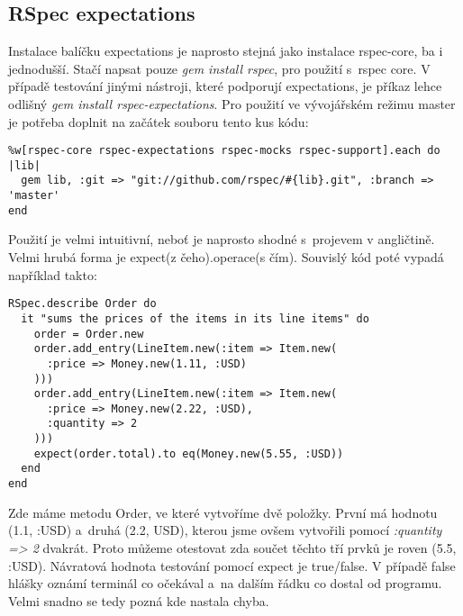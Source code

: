 \subsection{RSpec expectations}
\par Instalace balíčku expectations je naprosto stejná jako instalace rspec-core, ba i jednodušší. Stačí napsat pouze \textit{gem install rspec}, pro použití s~rspec core. V případě testování jinými nástroji, které podporují expectations, je příkaz lehce odlišný \textit{gem install rspec-expectations}. Pro použití ve vývojářském režimu master je potřeba doplnit na začátek souboru tento kus kódu:
\begin{verbatim}
%w[rspec-core rspec-expectations rspec-mocks rspec-support].each do |lib|
  gem lib, :git => "git://github.com/rspec/#{lib}.git", :branch => 'master'
end
\end{verbatim}
\par Použití je velmi intuitivní, neboť je naprosto shodné s~projevem v angličtině. Velmi hrubá forma je expect(z čeho).operace(s čím). Souvislý kód poté vypadá například takto:
\begin{verbatim}
RSpec.describe Order do
  it "sums the prices of the items in its line items" do
    order = Order.new
    order.add_entry(LineItem.new(:item => Item.new(
      :price => Money.new(1.11, :USD)
    )))
    order.add_entry(LineItem.new(:item => Item.new(
      :price => Money.new(2.22, :USD),
      :quantity => 2
    )))
    expect(order.total).to eq(Money.new(5.55, :USD))
  end
end
\end{verbatim}
\par Zde máme metodu Order, ve které vytvoříme dvě položky. První má hodnotu (1.1, :USD) a~druhá (2.2, USD), kterou jsme ovšem vytvořili pomocí \textit{:quantity => 2} dvakrát. Proto můžeme otestovat zda součet těchto tří prvků je roven (5.5, :USD). Návratová hodnota testování pomocí expect je true/false. V případě false hlášky oznámí terminál co očekával a~na dalším řádku co dostal od programu. Velmi snadno se tedy pozná kde nastala chyba.

